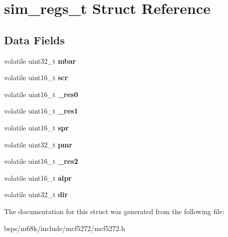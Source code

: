 \hypertarget{structsim__regs__t}{}\section{sim\+\_\+regs\+\_\+t Struct Reference}
\label{structsim__regs__t}
\subsection*{Data Fields}
\begin{DoxyCompactItemize}
\item 
\mbox{\label{structsim__regs__t_a62aaa727504f794a6818535a63f23e9f}} 
volatile uint32\+\_\+t {\bfseries mbar}
\item 
\mbox{\label{structsim__regs__t_a88033059906d197c72651c94d6abfd69}} 
volatile uint16\+\_\+t {\bfseries scr}
\item 
\mbox{\label{structsim__regs__t_af36c0451caec80fef357707e7d4fb77f}} 
volatile uint16\+\_\+t {\bfseries \+\_\+res0}
\item 
\mbox{\label{structsim__regs__t_a0495e48a4956960296849b0acb7d6bb8}} 
volatile uint16\+\_\+t {\bfseries \+\_\+res1}
\item 
\mbox{\label{structsim__regs__t_a9e0e37bfa6b826489e034762a4a7b445}} 
volatile uint16\+\_\+t {\bfseries spr}
\item 
\mbox{\label{structsim__regs__t_a56b3df40ce7cc1460a0c32eecf2618ff}} 
volatile uint32\+\_\+t {\bfseries pmr}
\item 
\mbox{\label{structsim__regs__t_a3d9e901ad4a87e40eec6c66c5865f4e1}} 
volatile uint16\+\_\+t {\bfseries \+\_\+res2}
\item 
\mbox{\label{structsim__regs__t_a88cbd333a19bd3bebf96b0cd35d0f9c8}} 
volatile uint16\+\_\+t {\bfseries alpr}
\item 
\mbox{\label{structsim__regs__t_a6cc33d06449e5a842d6357167731d3ff}} 
volatile uint32\+\_\+t {\bfseries dir}
\end{DoxyCompactItemize}


The documentation for this struct was generated from the following file\+:\begin{DoxyCompactItemize}
\item 
bsps/m68k/include/mcf5272/mcf5272.\+h\end{DoxyCompactItemize}
